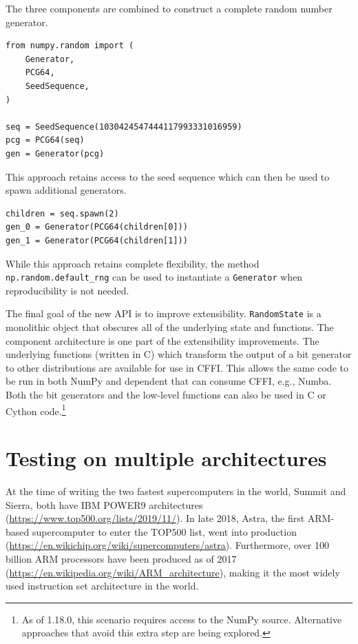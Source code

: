 The three components are combined to construct a complete random number
generator.

\begin{lstlisting}
from numpy.random import (
    Generator,
    PCG64,
    SeedSequence,
)

seq = SeedSequence(1030424547444117993331016959)
pcg = PCG64(seq)
gen = Generator(pcg)
\end{lstlisting}

This approach retains access to the seed sequence which can then be
used to spawn additional generators.

\begin{lstlisting}
children = seq.spawn(2)
gen_0 = Generator(PCG64(children[0]))
gen_1 = Generator(PCG64(children[1]))
\end{lstlisting}

While this approach retains complete flexibility, the method
\texttt{np.random.default\_rng} can be used to instantiate a \texttt{Generator} when
reproducibility is not needed.

The final goal of the new API is to improve extensibility. \texttt{RandomState} is
a monolithic object that obscures all of the underlying state and functions. The
component architecture is one part of the extensibility improvements. The
underlying functions (written in C) which transform the output of a bit
generator to other distributions are available for use in CFFI. This allows the
same code to be run in both NumPy and dependent that can consume CFFI, e.g.,
Numba. Both the bit generators and the low-level functions can also be used in C
or Cython code.\footnote{As of 1.18.0, this scenario requires access to the
NumPy source. Alternative approaches that avoid this extra step are being
explored.}

\section*{Testing on multiple architectures}

At the time of writing the two fastest supercomputers in the
world, Summit and Sierra, both have IBM POWER9 architectures
(\url{https://www.top500.org/lists/2019/11/}).
In late 2018, Astra, the first ARM-based supercomputer
to enter the TOP500 list, went into production
(\url{https://en.wikichip.org/wiki/supercomputers/astra}).
Furthermore, over 100 billion ARM processors have been produced as
of 2017 (\url{https://en.wikipedia.org/wiki/ARM_architecture}),
making it the most widely used instruction set architecture
in the world.

